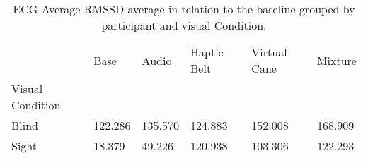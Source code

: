 
\begin{table}[!htb]
\centering
\caption{ECG Average RMSSD average in relation to the baseline grouped by participant and visual Condition.}
\label{tab:ecg_rmssd_average_group}
\begin{tabular}{llllll}
\toprule
{} &    Base &   Audio &  Haptic Belt &  Virtual Cane &  Mixture \\
Visual Condition &         &         &              &               &          \\
\midrule
Blind            & 122.286 & 135.570 &      124.883 &       152.008 &  168.909 \\
Sight            &  18.379 &  49.226 &      120.938 &       103.306 &  122.293 \\
\bottomrule
\end{tabular}
\end{table}

